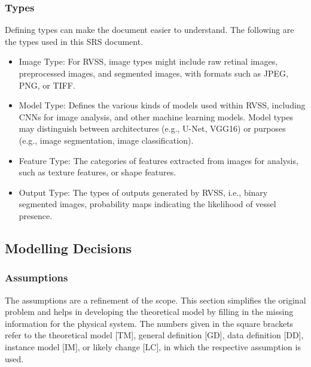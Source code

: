 \documentclass[12pt]{article}
\begin{document}
\subsubsection{Types}
Defining types can make the document easier to understand. The following are the types used in this SRS document.
\begin{itemize}
    \item Image Type: For RVSS, image types might include raw retinal images, preprocessed images, and segmented images, with formats such as JPEG, PNG, or TIFF.
    \item Model Type: Defines the various kinds of models used within RVSS, including CNNs for image analysis, and other machine learning models. Model types may distinguish between architectures (e.g., U-Net, VGG16) or purposes (e.g., image segmentation, image classification).
     \item Feature Type: The categories of features extracted from images for analysis, such as texture features, or shape features.
     \item Output Type: The types of outputs generated by RVSS, i.e., binary segmented images, probability maps indicating the likelihood of vessel presence.

\end{itemize}





\subsection{Modelling Decisions}
\subsubsection{Assumptions} \label{sec_assumpt}
The assumptions are a refinement of the scope. This section simplifies the original problem and helps in developing the theoretical model by filling in the missing information for the physical system. The numbers given in the square brackets refer to the theoretical model [TM], general definition [GD], data definition [DD], instance model [IM], or likely change [LC], in which the respective assumption is used.
 
\end{document}
